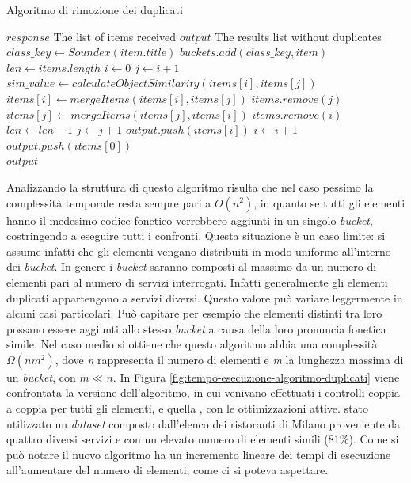 \begin{algorithm}
	\caption{Algoritmo di rimozione dei duplicati}
	\label{alg:algoritmo-rimozione-duplicati}
	\begin{algorithmic}
		\Require
		\Statex $ response $ \Comment The list of items received
		\Ensure
		\Statex $ output $ \Comment The results list without duplicates
		\Statex
		\State $ class\_key \gets Soundex(item.title) $
		\State $ buckets.add(class\_key, item) $
		\EndFor
		\State $ len \gets items.length $
		\State $ i \gets 0 $
		\State $ j \gets i + 1 $
		\State $ sim\_value \gets calculateObjectSimilarity(items[i], items[j])$
		\State $ items[i] \gets mergeItems(items[i], items[j]) $
		\State $ items.remove(j) $
		\Else
		\State $ items[j] \gets mergeItems(items[j], items[i]) $
		\State $ items.remove(i) $
		\EndIf
		\State $ len \gets len - 1 $
		\Else
		\State $ j \gets j + 1 $
		\EndIf
		\EndWhile
		\State $ output.push(items[i]) $
		\State $ i \gets i + 1 $
		\EndWhile
		\Else
		\State $ output.push(items[0]) $
		\EndIf
		\EndFor\\
		\Return $ output $
	\end{algorithmic}
\end{algorithm}

Analizzando la struttura di questo algoritmo risulta che nel caso pessimo la complessità temporale resta sempre pari a $ O(n^2) $, in quanto se tutti gli elementi hanno il medesimo codice fonetico verrebbero aggiunti in un singolo \emph{bucket}, costringendo a eseguire tutti i confronti. Questa situazione è un caso limite: si assume infatti che gli elementi vengano distribuiti in modo uniforme all'interno dei \emph{bucket}. In genere i \emph{bucket} saranno composti al massimo da un numero di elementi pari al numero di servizi interrogati. Infatti generalmente gli elementi duplicati appartengono a servizi diversi. Questo valore può variare leggermente in alcuni casi particolari. Può capitare per esempio che elementi distinti tra loro possano essere aggiunti allo stesso \emph{bucket} a causa della loro pronuncia fonetica simile. Nel caso medio si ottiene che questo algoritmo abbia una complessità $ \Omega(nm^2) $, dove \emph{n} rappresenta il numero di elementi e \emph{m} la lunghezza massima di un \emph{bucket}, con $ m \ll n $. In Figura \ref{fig:tempo-esecuzione-algoritmo-duplicati} viene confrontata la versione  dell'algoritmo, in cui venivano effettuati i controlli coppia a coppia per tutti gli elementi, e quella , con le ottimizzazioni attive. \upe stato utilizzato un \emph{dataset} composto dall'elenco dei ristoranti di Milano proveniente da quattro diversi servizi e con un elevato numero di elementi simili ($ 81\% $). Come si può notare il nuovo algoritmo ha un incremento lineare dei tempi di esecuzione all'aumentare del numero di elementi, come ci si poteva aspettare.

